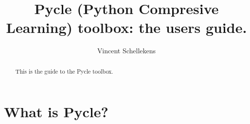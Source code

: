 \documentclass[]{article}
\title{Pycle (\textbf{Py}thon \textbf{C}ompresive \textbf{Le}arning) toolbox: the users guide.}
\author{Vincent Schellekens}
\begin{document}
\maketitle

\begin{abstract}
	This is the guide to the Pycle toolbox.
\end{abstract}

\section{What is Pycle?}
\end{document}
